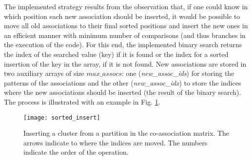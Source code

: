The implemented strategy results from the observation that, if one could know in which position each new association should be inserted, it would be possible to move all old associations to their final sorted positions and insert the new ones in an efficient manner with minimum number of comparisons (and thus branches in the execution of the code).
For this end, the implemented binary search returns the index of the searched value (key) if it is found or the index for a sorted insertion of the key in the array, if it is not found.
New associations are stored in two auxiliary arrays of size $max\_assocs$: one (\emph{new\_assoc\_ids}) for storing the patterns of the associations and the other (\emph{new\_assoc\_idx}) to store the indices where the new associations should be inserted (the result of the binary search).
The process is illustrated with an example in Fig. \ref{fig:normal part}. %

\begin{figure}[hbtp]
\centering
\texttt{[image: sorted\_insert]}
\caption{Inserting a cluster from a partition in the co-association matrix. The arrows indicate to where the indices are moved. The numbers indicate the order of the operation.}
\label{fig:normal part}
\end{figure}


